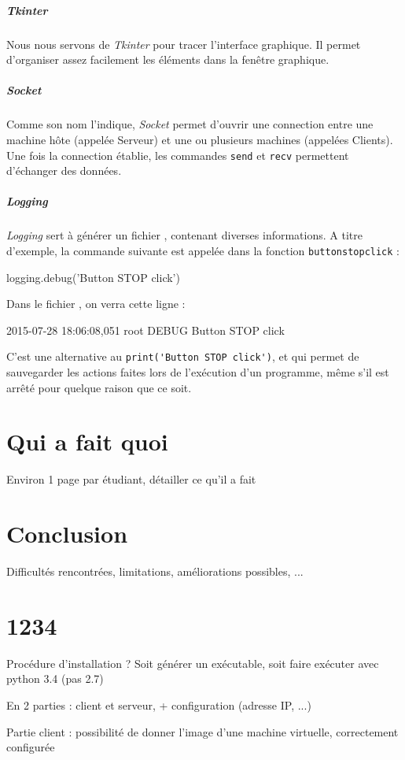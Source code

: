 \documentclass[12pt,a4paper]{report}
\begin{document}
\paragraph{Tkinter}

Nous nous servons de \textit{Tkinter} pour tracer l'interface graphique. Il permet d'organiser assez facilement les éléments dans la fenêtre graphique.

\paragraph{Socket}

Comme son nom l'indique, \textit{Socket} permet d'ouvrir une connection entre une machine hôte (appelée Serveur) et une ou plusieurs machines (appelées Clients). Une fois la connection établie, les commandes \verb=send= et \verb=recv= permettent d'échanger des données.

\paragraph{Logging}

\textit{Logging} sert à générer un fichier , contenant diverses informations. A titre d'exemple, la commande suivante est appelée dans la fonction \verb=buttonstopclick= :

\begin{verbatimtab}[3]
logging.debug('Button STOP click')
\end{verbatimtab}

Dans le fichier , on verra cette ligne :

\begin{verbatimtab}[3]
2015-07-28 18:06:08,051 root	DEBUG	Button STOP click
\end{verbatimtab}

C'est une alternative au \verb=print('Button STOP click')=, et qui permet de sauvegarder les actions faites lors de l'exécution d'un programme, même s'il est arrêté pour quelque raison que ce soit.

\chapter{Qui a fait quoi}

Environ 1 page par étudiant, détailler ce qu'il a fait

\chapter{Conclusion}

Difficultés rencontrées, limitations, améliorations possibles, ...

\appendix
\chapter{1234}

Procédure d'installation ? Soit générer un exécutable, soit faire exécuter avec python 3.4 (pas 2.7)

En 2 parties : client et serveur, + configuration (adresse IP, ...)

Partie client : possibilité de donner l'image d'une machine virtuelle, correctement configurée
\end{document}
